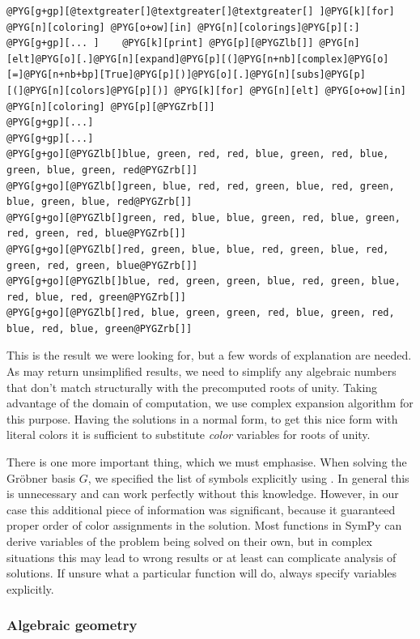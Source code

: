 \begin{Verbatim}[commandchars=@\[\]]
@PYG[g+gp][@textgreater[]@textgreater[]@textgreater[] ]@PYG[k][for] @PYG[n][coloring] @PYG[o+ow][in] @PYG[n][colorings]@PYG[p][:]
@PYG[g+gp][... ]    @PYG[k][print] @PYG[p][@PYGZlb[]] @PYG[n][elt]@PYG[o][.]@PYG[n][expand]@PYG[p][(]@PYG[n+nb][complex]@PYG[o][=]@PYG[n+nb+bp][True]@PYG[p][)]@PYG[o][.]@PYG[n][subs]@PYG[p][(]@PYG[n][colors]@PYG[p][)] @PYG[k][for] @PYG[n][elt] @PYG[o+ow][in] @PYG[n][coloring] @PYG[p][@PYGZrb[]]
@PYG[g+gp][...]
@PYG[g+gp][...]
@PYG[g+go][@PYGZlb[]blue, green, red, red, blue, green, red, blue, green, blue, green, red@PYGZrb[]]
@PYG[g+go][@PYGZlb[]green, blue, red, red, green, blue, red, green, blue, green, blue, red@PYGZrb[]]
@PYG[g+go][@PYGZlb[]green, red, blue, blue, green, red, blue, green, red, green, red, blue@PYGZrb[]]
@PYG[g+go][@PYGZlb[]red, green, blue, blue, red, green, blue, red, green, red, green, blue@PYGZrb[]]
@PYG[g+go][@PYGZlb[]blue, red, green, green, blue, red, green, blue, red, blue, red, green@PYGZrb[]]
@PYG[g+go][@PYGZlb[]red, blue, green, green, red, blue, green, red, blue, red, blue, green@PYGZrb[]]
\end{Verbatim}
\noindent
This is the result we were looking for, but a few words of explanation are needed. As  may
return unsimplified results, we need to simplify any algebraic numbers that don't match structurally with
the precomputed roots of unity. Taking advantage of the domain of computation, we use complex expansion
algorithm for this purpose. Having the solutions in a normal form, to get this nice form with literal
colors it is sufficient to substitute \emph{color} variables for roots of unity.

There is one more important thing, which we must emphasise. When solving the Gröbner basis $G$, we
specified the list of symbols explicitly using . In general this is unnecessary and 
can work perfectly without this knowledge. However, in our case this additional piece of information
was significant, because it guaranteed proper order of color assignments in the solution. Most functions
in SymPy can derive variables of the problem being solved on their own, but in complex situations this
may lead to wrong results or at least can complicate analysis of solutions. If unsure what a particular
function will do, always specify variables explicitly.


\subsubsection{Algebraic geometry}

